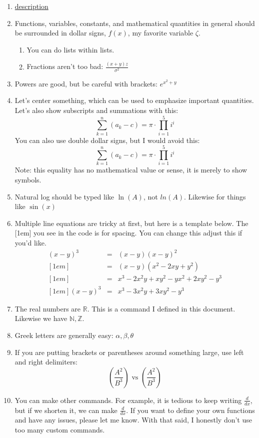 \documentclass[11pt]{article}
\newcommand{\ddx}{\frac{d}{dx}}
\theoremstyle{definition}
\newcommand{\R}{\mathbb{R}}
\newcommand{\Z}{\mathbb{Z}}
\newcommand{\N}{\mathbb{N}}
\begin{document}
 \begin{spacing}{1.5}
\chead{} 

\begin{enumerate}
    \item \href{google.com}{description}
    \item  Functions, variables, constants, and mathematical quantities in general should be surrounded in dollar signs, $f(x)$, my favorite variable $\zeta$.
    \begin{enumerate}
        \item You can do lists within lists.
        \item Fractions aren't too bad: $\frac{(x+y)z}{\sigma^2}$
    \end{enumerate}
    \item Powers are good, but be careful with brackets: $e^{x^2+y}$
    \item Let's center something, which can be used to emphasize important quantities.  Let's also show subscripts and summations with this:
    \[ \sum_{k=1}^n (a_k-c) = \pi\cdot \prod_{i=1}^5 i^i  \]
    You can also use double dollar signs, but I would avoid this:
    $$\sum_{k=1}^n (a_k-c) = \pi\cdot \prod_{i=1}^5 i^i $$ 
    Note: this equality has no mathematical value or sense, it is merely to show symbols.
    \item Natural log should be typed like $\ln(A)$, not $ln(A)$.  Likewise for things like $\sin(x)$
    \item Multiple line equations are tricky at first, but here is a template below.  The [1em] you see in the code is for spacing. You can change this adjust this if you'd like. 
    \begin{eqnarray*}
    (x-y)^3 &=& (x-y)(x-y)^2 \\ [1em]
    &=& (x-y)(x^2-2xy+y^2) \\ [1em]
    &=& x^3-2x^2y+xy^2-yx^2+2xy^2-y^3 \\ [1em]
    (x-y)^3 &=& x^3 - 3x^2y + 3xy^2 -y^3 
    \end{eqnarray*}
    \item The real numbers are $\R$. This is a command I defined in this document. Likewise we have $\N, \Z$.
    \item Greek letters are generally easy: $\alpha, \beta, \theta$
    \item If you are putting brackets or parentheses around something large, use left and right delimiters:
    \[ (\frac{A^2}{B^3}) \text { vs } \left(\frac{A^2}{B^3}\right) \]
    \item You can make other commands.  For example, it is tedious to keep writing $\frac{d}{dx}$, but if we shorten it, we can make $\ddx$.  If you want to define your own functions and have any issues, please let me know.  With that said, I honestly don't use too many custom commands.
\end{enumerate}


\end{spacing}
\end{document}
